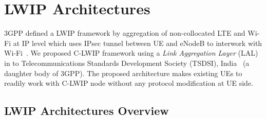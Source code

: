 \documentclass[conference]{IEEEtran}
\begin{document}
\section{LWIP Architectures}
\label{sec:proposedSystem}
3GPP defined a LWIP framework by aggregation of non-collocated LTE and Wi-Fi at IP level which uses IPsec tunnel between UE and eNodeB to interwork with Wi-Fi~\cite{lwip3gpp}. We proposed C-LWIP framework using a \textit{Link Aggregation Layer} (LAL) in to Telecommunications Standards Development Society (TSDSI), India~\cite{SWIP50} (a daughter body of 3GPP). The proposed architecture makes existing UEs to readily work with C-LWIP node without any protocol modification at UE side.

\subsection{LWIP Architectures Overview}
\end{document}
